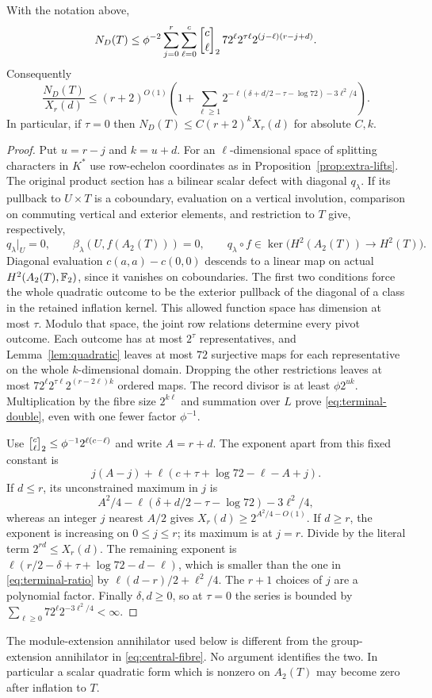 \begin{proposition}\label{prop:terminal-bound}
With the notation above,
\begin{equation}\label{eq:terminal-double}
 N_D(T)\leq\phi^{-2}\sum_{j=0}^r\sum_{\ell=0}^c
 \gauss c\ell2\,72^\ell 2^{\tau\ell}
                    2^{(j-\ell)(r-j+d)}.
\end{equation}
Consequently
\begin{equation}\label{eq:terminal-ratio}
 \frac{N_D(T)}{X_r(d)}\leq (r+2)^{O(1)}
 \left(1+\sum_{\ell\geq1}
 2^{-\ell(\delta+d/2-\tau-\log72)-3\ell^2/4}\right).
\end{equation}
In particular, if $\tau=0$ then
$N_D(T)\leq C(r+2)^kX_r(d)$ for absolute $C,k$.
\end{proposition}
\begin{proof}
Put $u=r-j$ and $k=u+d$. For an $\ell$-dimensional space of splitting
characters in $K^*$ use row-echelon coordinates as in
Proposition~\ref{prop:extra-lifts}. The original product section has a
bilinear scalar defect with diagonal $q_\lambda$. If its pullback to
$U\times T$ is a coboundary, evaluation on a vertical involution,
comparison on commuting vertical and exterior elements, and restriction
to $T$ give, respectively,
\[
 q_\lambda|_U=0,\qquad
 \beta_\lambda(U,f(A_2(T)))=0,\qquad
 q_\lambda\circ f\in\ker\bigl(H^2(A_2(T))\to H^2(T)\bigr).
\]
Diagonal evaluation $c(a,a)-c(0,0)$ descends to a linear map on actual
$H^2(A_2(T),\mathbb F_2)$, since it vanishes on coboundaries. The first two
conditions force the whole quadratic outcome to be the exterior pullback
of the diagonal of a class in the retained inflation kernel. This allowed
function space has dimension at most $\tau$. Modulo that space, the
joint row relations determine every pivot outcome. Each outcome has at
most $2^\tau$ representatives, and Lemma~\ref{lem:quadratic} leaves at
most $72$ surjective maps for each representative on the whole
$k$-dimensional domain.
Dropping the other restrictions leaves at most
$72^\ell2^{\tau\ell}2^{(r-2\ell)k}$ ordered maps.
The record divisor is at least $\phi2^{uk}$. Multiplication by the
fibre size $2^{k\ell}$ and summation over $L$ prove
\eqref{eq:terminal-double}, even with one fewer factor $\phi^{-1}$.

Use $\gauss c\ell2\leq\phi^{-1}2^{\ell(c-\ell)}$ and write
$A=r+d$. The exponent apart from this fixed constant is
\[
 j(A-j)+\ell(c+\tau+\log72-\ell-A+j).
\]
If $d\leq r$, its unconstrained maximum in $j$ is
\[
 A^2/4-\ell(\delta+d/2-\tau-\log72)-3\ell^2/4,
\]
whereas an integer $j$ nearest $A/2$ gives
$X_r(d)\geq2^{A^2/4-O(1)}$. If $d\geq r$, the exponent is increasing
on $0\leq j\leq r$; its maximum is at $j=r$. Divide by the literal
term $2^{rd}\leq X_r(d)$. The remaining exponent is
$\ell(r/2-\delta+\tau+\log72-d-\ell)$, which is smaller than the
one in \eqref{eq:terminal-ratio} by
$\ell(d-r)/2+\ell^2/4$. The $r+1$ choices of $j$ are a polynomial
factor. Finally $\delta,d\geq0$, so at $\tau=0$ the series is bounded
by $\sum_{\ell\geq0}72^\ell2^{-3\ell^2/4}<\infty$.
\end{proof}

\begin{remark}
The module-extension annihilator used below is different from the
group-extension annihilator in \eqref{eq:central-fibre}. No argument
identifies the two. In particular a scalar quadratic form which is
nonzero on $A_2(T)$ may become zero after inflation to $T$.
\end{remark}
